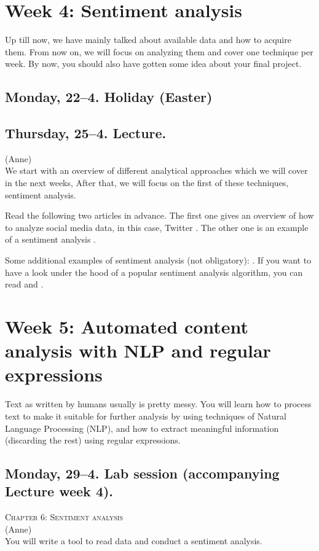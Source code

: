 \section*{Week 4: Sentiment analysis}
Up till now, we have mainly talked about available data and how to acquire them. From now on, we will focus on analyzing them and cover one technique per week. By now, you should also have gotten some idea about your final project.

\subsection*{Monday, 22--4. Holiday (Easter)}

\subsection*{Thursday, 25--4. Lecture.}
{\footnotesize{(Anne)}\\}
We start with an overview of different analytical approaches which we will cover in the next weeks, After that, we will focus on the first of these techniques, sentiment analysis.

Read the following two articles in advance. The first one gives an overview of how to analyze social media data, in this case, Twitter \citep{Bruns2013}. The other one is an example of a sentiment analysis \citep{Mostafa2013}.

Some additional examples of sentiment analysis (not obligatory): \cite{Huang2007,Pestian2012}. If you want to have a look under the hood of a popular sentiment analysis algorithm, you can read \cite{Thelwall2012} and \cite{Hutto2014}.



\section*{Week 5: Automated content analysis with NLP and regular expressions}
Text as written by humans usually is pretty messy. You will learn how to process text to make it suitable for further analysis by using techniques of Natural Language Processing (NLP), and how to extract meaningful information (discarding the rest) using regular expressions.



\subsection*{Monday, 29--4. Lab session (accompanying Lecture week 4).}
\textsc{ Chapter 6: Sentiment analysis}\\
{\footnotesize{(Anne)}\\}
You will write a tool to read data and conduct a sentiment analysis.

